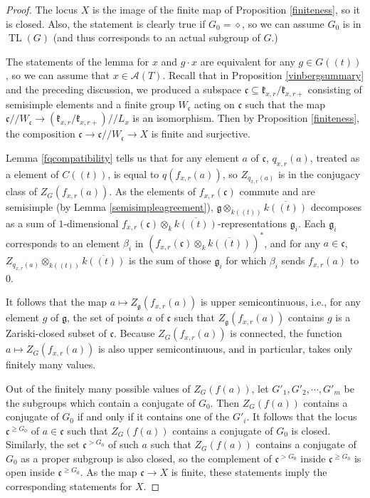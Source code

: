 \documentclass[12pt]{article}
\DeclareMathOperator{\TL}{TL}
\theoremstyle{remark}
\begin{document}
\begin{proof}
The locus $X$ is the image of the finite map of Proposition \ref{finiteness}, so it is closed. Also, the statement is clearly true if $G_0={\diamond}$, so we can assume $G_0$ is in $\TL(G)$ (and thus corresponds to an actual subgroup of $G$.)

The statements of the lemma for $x$ and $g\cdot x$ are equivalent for any $g\in G((t))$, so we can assume that $x\in\mathcal{A}(T)$. Recall that in Proposition \ref{vinbergsummary} and the preceding discussion, we produced a subspace $\mathfrak{c}\subseteq\mathfrak{k}_{x,r}/\mathfrak{k}_{x,r+}$ consisting of semisimple elements and a finite group $W_{\mathfrak{c}}$ acting on $\mathfrak{c}$ such that the map $\mathfrak{c}//W_{\mathfrak{c}}\rightarrow(\mathfrak{k}_{x,r}/\mathfrak{k}_{x,r+})//L_x$ is an isomorphism. Then by Proposition \ref{finiteness}, the composition $\mathfrak{c}\rightarrow\mathfrak{c}//W_{\mathfrak{c}}\rightarrow X$ is finite and surjective.

Lemma \ref{fqcompatibility} tells us that for any element $a$ of $\mathfrak{c}$, $q_{x,r}(a)$, treated as a element of $C((t))$, is equal to $q(f_{x,r}(a))$, so $Z_{q_{x,r}(a)}$ is in the conjugacy class of $Z_{G}(f_{x,r}(a)).$ As the elements of $f_{x,r}(\mathfrak{c})$ commute and are semisimple (by Lemma \ref{semisimpleagreement}), $\mathfrak{g}\otimes_{k((t))}\overline{k((t))}$ decomposes as a sum of $1$-dimensional $f_{x,r}(\mathfrak{c})\otimes_k \overline{k((t))}$-representations $\mathfrak{g}_i$. Each $\mathfrak{g}_i$ corresponds to an element $\beta_i$ in $(f_{x,r}(\mathfrak{c})\otimes_k \overline{k((t))})^*$, and for any $a\in\mathfrak{c}$, $Z_{q_{x,r}(a)}\otimes_{k((t))}\overline{k((t))}$ is the sum of those $\mathfrak{g}_i$ for which $\beta_i$ sends $f_{x,r}(a)$ to $0$.

It follows that the map $a\mapsto Z_{\mathfrak{g}}(f_{x,r}(a))$ is upper semicontinuous, i.e., for any element $g$ of $\mathfrak{g}$, the set of points $a$ of $\mathfrak{c}$ such that $Z_{\mathfrak{g}}(f_{x,r}(a))$ contains $g$ is a Zariski-closed subset of $\mathfrak{c}.$ Because $Z_G(f_{x,r}(a))$ is connected, the function $a\mapsto Z_G(f_{x,r}(a))$ is also upper semicontinuous, and in particular, takes only finitely many values.

Out of the finitely many possible values of $Z_G(f(a))$, let $G'_1,G'_2,\cdots, G'_m$ be the subgroups which contain a conjugate of $G_0$. Then $Z_G(f(a))$ contains a conjugate of $G_0$ if and only if it contains one of the $G'_i.$ It follows that the locus $\mathfrak{c}^{\geq G_0}$ of $a\in\mathfrak{c}$ such that $Z_G(f(a))$ contains a conjugate of $G_0$ is closed. Similarly, the set $\mathfrak{c}^{> G_0}$ of such $a$ such that $Z_G(f(a))$ contains a conjugate of $G_0$ as a proper subgroup is also closed, so the complement of $\mathfrak{c}^{> G_0}$ inside $\mathfrak{c}^{\geq G_0}$ is open inside $\mathfrak{c}^{\geq G_0}$. As the map $\mathfrak{c}\rightarrow X$ is finite, these statements imply the corresponding statements for $X$.
\end{proof}
\end{document}
